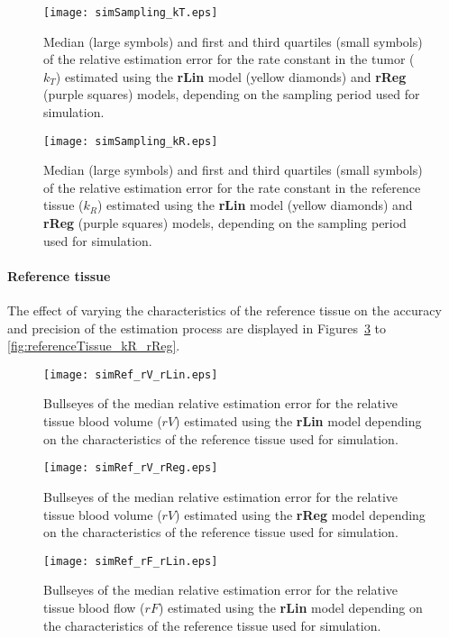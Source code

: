 \begin{figure}
\texttt{[image: simSampling\_kT.eps]}
\caption{Median (large symbols) and first and third quartiles (small symbols) of the relative estimation error for the rate constant in the tumor ($k_T$) estimated using the \textbf{rLin} model (yellow diamonds) and \textbf{rReg} (purple squares) models, depending on the sampling period used for simulation.}
\label{fig:sampling_kT}
\end{figure}

\begin{figure}
\texttt{[image: simSampling\_kR.eps]}
\caption{Median (large symbols) and first and third quartiles (small symbols) of the relative estimation error for the rate constant in the reference tissue ($k_R$) estimated using the \textbf{rLin} model (yellow diamonds) and \textbf{rReg} (purple squares) models, depending on the sampling period used for simulation.}
\label{fig:sampling_kR}
\end{figure}

\paragraph{Reference tissue}
The effect of varying the characteristics of the reference tissue on the accuracy and precision of the estimation process are displayed in Figures~\ref{fig:referenceTissue_rV_rLin} to \ref{fig:referenceTissue_kR_rReg}. 

\begin{figure}
\texttt{[image: simRef\_rV\_rLin.eps]}
\caption{Bullseyes of the median relative estimation error for the relative tissue blood volume ($rV$) estimated using the \textbf{rLin} model depending on the characteristics of the reference tissue used for simulation.}
\label{fig:referenceTissue_rV_rLin}
\end{figure}

\begin{figure}
\texttt{[image: simRef\_rV\_rReg.eps]}
\caption{Bullseyes of the median relative estimation error for the relative tissue blood volume ($rV$) estimated using the \textbf{rReg} model depending on the characteristics of the reference tissue used for simulation.}
\label{fig:referenceTissue_rV_rReg}
\end{figure}

\begin{figure}
\texttt{[image: simRef\_rF\_rLin.eps]}
\caption{Bullseyes of the median relative estimation error for the relative tissue blood flow ($rF$) estimated using the \textbf{rLin} model depending on the characteristics of the reference tissue used for simulation.}
\label{fig:referenceTissue_rF_rLin}
\end{figure}

